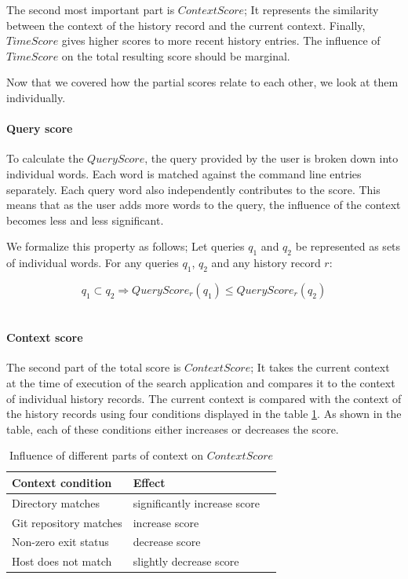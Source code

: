 The second most important part is \(ContextScore\); It represents the similarity between the context of the history record and the current context. Finally, \(TimeScore\) gives higher scores to more recent history entries. The influence of \(TimeScore\) on the total resulting score should be marginal.

Now that we covered how the partial scores relate to each other, we look at them individually.





\paragraph{Query score}

To calculate the \(QueryScore\), the query provided by the user is broken down into individual words. 
Each word is matched against the command line entries separately. Each query word also independently contributes to the score. This means that as the user adds more words to the query, the influence of the context becomes less and less significant.

We formalize this property as follows; Let queries \(q_1\) and \(q_2\) be represented as sets of individual words. For any queries \(q_1\), \(q_2\) and any history record \(r\): 

\[ q_1 \subset q_2 \Rightarrow QueryScore_r(q_1) \leq QueryScore_r(q_2)\]\

\paragraph{Context score}
The second part of the total score is \(ContextScore\); It takes the current context at the time of execution of the search application and compares it to the context of individual history records. 
The current context is compared with the context of the history records using four conditions displayed in the table \ref{tab:score-matching-context}. As shown in the table, each of these conditions either increases or decreases the score.

\begin{table}[h]
\centering
\begin{tabular}{lll}
\hline \hline
Context condition & Effect \\
\hline
Directory matches & significantly increase score \\ 
Git repository matches & increase score \\ 
Non-zero exit status & decrease score \\
Host does not match & slightly decrease score \\ 
\hline \hline
\end{tabular}
\caption{Influence of different parts of context on \(ContextScore\)}
\label{tab:score-matching-context}
\end{table}

